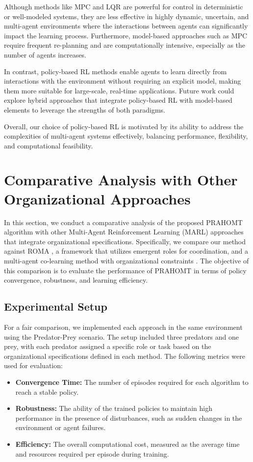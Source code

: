 \documentclass[sigconf,anonymous]{aamas}
\begin{document}
Although methods like MPC and LQR are powerful for control in deterministic or well-modeled systems, they are less effective in highly dynamic, uncertain, and multi-agent environments where the interactions between agents can significantly impact the learning process. Furthermore, model-based approaches such as MPC require frequent re-planning and are computationally intensive, especially as the number of agents increases.

In contrast, policy-based RL methods enable agents to learn directly from interactions with the environment without requiring an explicit model, making them more suitable for large-scale, real-time applications. Future work could explore hybrid approaches that integrate policy-based RL with model-based elements to leverage the strengths of both paradigms.

Overall, our choice of policy-based RL is motivated by its ability to address the complexities of multi-agent systems effectively, balancing performance, flexibility, and computational feasibility.


\section{Comparative Analysis with Other Organizational Approaches}
\label{sec:comparison}

In this section, we conduct a comparative analysis of the proposed PRAHOMT algorithm with other Multi-Agent Reinforcement Learning (MARL) approaches that integrate organizational specifications. Specifically, we compare our method against ROMA \cite{roma2020}, a framework that utilizes emergent roles for coordination, and a multi-agent co-learning method with organizational constraints \cite{colearning2021}. The objective of this comparison is to evaluate the performance of PRAHOMT in terms of policy convergence, robustness, and learning efficiency.

\subsection{Experimental Setup}
For a fair comparison, we implemented each approach in the same environment using the Predator-Prey scenario. The setup included three predators and one prey, with each predator assigned a specific role or task based on the organizational specifications defined in each method. The following metrics were used for evaluation:
\begin{itemize}
    \item \textbf{Convergence Time:} The number of episodes required for each algorithm to reach a stable policy.
    \item \textbf{Robustness:} The ability of the trained policies to maintain high performance in the presence of disturbances, such as sudden changes in the environment or agent failures.
    \item \textbf{Efficiency:} The overall computational cost, measured as the average time and resources required per episode during training.
\end{itemize}
\end{document}
